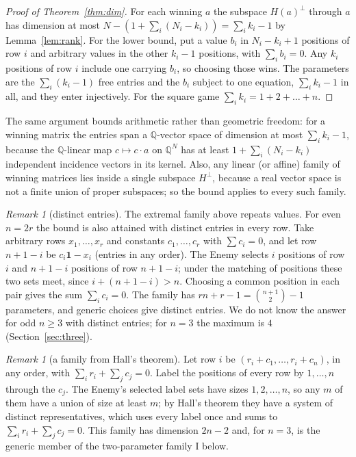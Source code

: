 \documentclass[11pt]{article}
\theoremstyle{definition}
\theoremstyle{remark}
\newtheorem{remark}[theorem]{Remark}
\newcommand{\Q}{\mathbb{Q}}
\begin{document}
\begin{proof}[Proof of Theorem~\ref{thm:dim}]
For each winning $a$ the subspace $H(a)^\perp$ through $a$ has dimension at most $N-(1+\sum_i(N_i-k_i))=\sum_ik_i-1$ by Lemma~\ref{lem:rank}. For the lower bound, put a value $b_i$ in $N_i-k_i+1$ positions of row $i$ and arbitrary values in the other $k_i-1$ positions, with $\sum_ib_i=0$. Any $k_i$ positions of row $i$ include one carrying $b_i$, so choosing those wins. The parameters are the $\sum_i(k_i-1)$ free entries and the $b_i$ subject to one equation, $\sum_ik_i-1$ in all, and they enter injectively. For the square game $\sum_ik_i=1+2+\dots+n$.
\end{proof}

The same argument bounds arithmetic rather than geometric freedom: for a winning matrix the entries span a $\Q$-vector space of dimension at most $\sum_ik_i-1$, because the $\Q$-linear map $c\mapsto c\cdot a$ on $\Q^N$ has at least $1+\sum_i(N_i-k_i)$ independent incidence vectors in its kernel. Also, any linear (or affine) family of winning matrices lies inside a single subspace $H^\perp$, because a real vector space is not a finite union of proper subspaces; so the bound applies to every such family.

\begin{remark}[distinct entries]\label{rem:paired}
The extremal family above repeats values. For even $n=2r$ the bound is also attained with distinct entries in every row. Take arbitrary rows $x_1,\dots,x_r$ and constants $c_1,\dots,c_r$ with $\sum c_i=0$, and let row $n+1-i$ be $c_i\mathbf 1-x_i$ (entries in any order). The Enemy selects $i$ positions of row $i$ and $n+1-i$ positions of row $n+1-i$; under the matching of positions these two sets meet, since $i+(n+1-i)>n$. Choosing a common position in each pair gives the sum $\sum_ic_i=0$. The family has $rn+r-1=\binom{n+1}2-1$ parameters, and generic choices give distinct entries. We do not know the answer for odd $n\ge3$ with distinct entries; for $n=3$ the maximum is $4$ (Section~\ref{sec:three}).
\end{remark}

\begin{remark}[a family from Hall's theorem]
Let row $i$ be $(r_i+c_1,\dots,r_i+c_n)$, in any order, with $\sum_ir_i+\sum_jc_j=0$. Label the positions of every row by $1,\dots,n$ through the $c_j$. The Enemy's selected label sets have sizes $1,2,\dots,n$, so any $m$ of them have a union of size at least $m$; by Hall's theorem they have a system of distinct representatives, which uses every label once and sums to $\sum_ir_i+\sum_jc_j=0$. This family has dimension $2n-2$ and, for $n=3$, is the generic member of the two-parameter family I below.
\end{remark}
\end{document}

